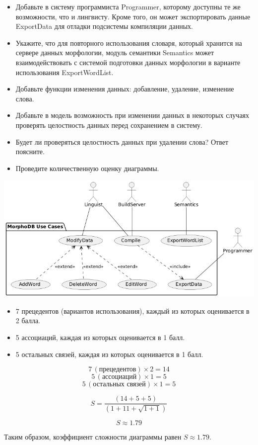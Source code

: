 \documentclass{article}
\begin{document}
\begin{itemize}
    \item Добавьте в систему программиста Programmer, которому доступны те же возможности, что и лингвисту. Кроме того, он может экспортировать данные ExportData для отладки подсистемы компиляции данных.
    \item Укажите, что для повторного использования словаря, который хранится на сервере данных морфологии, модуль семантики Semantics может взаимодействовать с системой подготовки данных морфологии в варианте использования ExportWordList.
    \item Добавьте функции изменения данных: добавление, удаление, изменение слова.
    \item Добавьте в модель возможность при изменении данных в некоторых случаях проверять целостность данных перед сохранением в систему.
    \item Будет ли проверяться целостность данных при удалении слова? Ответ поясните.
    \item Проведите количественную оценку диаграммы.
\end{itemize}

\includegraphics[width=\textwidth]{7.png}

\begin{itemize}
    \item 7 прецедентов (вариантов использования), каждый из которых оценивается в 2 балла.
    \item 5 ассоциаций, каждая из которых оценивается в 1 балл.
    \item 5 остальных связей, каждая из которых оценивается в 1 балл.
\end{itemize}


\[
7 \, (\text{прецедентов}) \times 2 = 14
\]
\[
5 \, (\text{ассоциаций}) \times 1 = 5
\]
\[
5 \, (\text{остальных связей}) \times 1 = 5
\]

\[
S = \frac{(14 + 5 + 5)}{(1 + 11 + \sqrt{1 + 1})}
\]

\[
S \approx 1.79
\]

Таким образом, коэффициент сложности диаграммы равен \( S \approx 1.79 \).
\end{document}
